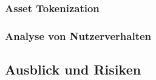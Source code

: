 \subsubsection{Asset Tokenization}


\subsubsection{Analyse von Nutzerverhalten}




\subsection{Ausblick und Risiken}

